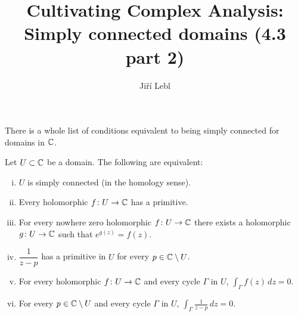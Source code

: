 \documentclass[10pt,aspectratio=169]{beamer}
\author{Ji\v{r}\'i Lebl}
\institute[OSU]{%
Departemento pri Matematiko de Oklahoma {\^S}tata Universitato}
\title{Cultivating Complex Analysis:\\%
Simply connected domains (4.3 part 2)}
\date{}
\begin{document}
\begin{frame}
\titlepage
\end{frame}

\begin{frame}

There is a whole list of conditions equivalent
to being simply connected for domains in ${\mathbb{C}}$.

\pause

\begin{proposition}
Let $U \subset {\mathbb{C}}$ be a domain.  The following are equivalent:
\begin{enumerate}[(i)]
\item \label{thm:simplyconnected:i}
$U$ is simply connected (in the homology sense).
\pause
\item \label{thm:simplyconnected:ii}
Every holomorphic $f \colon U \to {\mathbb{C}}$ has a primitive.
\pause
\item \label{thm:simplyconnected:iii}
For every nowhere zero holomorphic $f \colon U \to {\mathbb{C}}$ there exists
a holomorphic $g \colon U \to {\mathbb{C}}$ such that $e^{g(z)} = f(z)$.
\pause
\item \label{thm:simplyconnected:iv}
$\dfrac{1}{z-p}$ has a primitive in $U$ for every $p \in {\mathbb{C}} \setminus U$.
\pause
\item \label{thm:simplyconnected:v}
For every holomorphic $f \colon U \to {\mathbb{C}}$ and every
cycle $\Gamma$ in $U$, \quad
$\displaystyle
\int_\Gamma f(z) \, dz = 0$.
\pause
\item \label{thm:simplyconnected:vi}
For every $p \in {\mathbb{C}} \setminus U$ and every
cycle $\Gamma$ in $U$, \quad
$\displaystyle
\int_\Gamma \frac{1}{z-p} \, dz = 0$.
\end{enumerate}
\end{proposition}

\end{frame}
\end{document}
